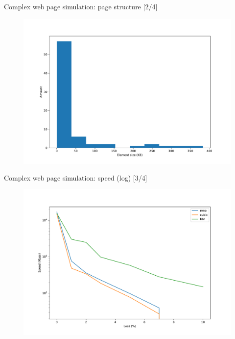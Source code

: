 \documentclass[13pt,aspectratio=43]{beamer}
\begin{document}
\begin{frame}{Complex web page simulation: page structure [2/4]}
  \begin{figure}
	  \includegraphics[width=\textwidth,height=\textheight,keepaspectratio]{../http_test/page_stat.pdf}
  \end{figure}

\end{frame}



\begin{frame}{Complex web page simulation: speed (log) [3/4]}
  \begin{figure}
	  \includegraphics[width=\textwidth,height=\textheight,keepaspectratio]{../http_test/plot_log.pdf}
  \end{figure}
\end{frame}
\end{document}
